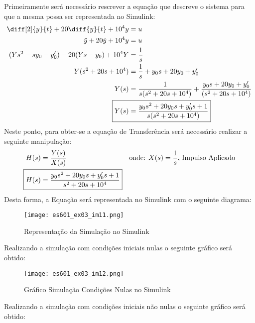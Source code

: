 \documentclass{article}
\begin{document}
            \begin{resolution}
                Primeiramente será necessário rescrever a equação que descreve o sistema para que a mesma possa ser representada no Simulink:
                    \begin{align}
                        \diff[2]{y}{t} + 20\diff{y}{t} +10^4y &= u\nonumber\\
                        \ddot{y} + 20\dot{y} + 10^4y          &= u\nonumber\\
                        (Ys^2 - sy_{0} - y'_{0}) + 20(Ys - y_{0}) + 10^4Y &= \frac{1}{s}\nonumber\\
                        Y(s^2 + 20s + 10^4) &= \frac{1}{s} + y_{0}s + 20y_{0} + y'_ {0}\nonumber\\
                        Y(s) &= \frac{1}{s(s^2 + 20s + 10^4)} + \frac{y_{0}s + 20y_{0} + y'_{0}}{(s^2 + 20s + 10^4)} \label{eq:simulinkYsB}\\
                        \Aboxed{Y(s) &= \frac{y_{0}s^2 + 20y_{0}s + y'_{0}s + 1}{s(s^2 + 20s + 10^4)}}
                    \end{align}
                Neste ponto, para obter-se a equação de Transferência será necessário realizar a seguinte manipulação:
                    \begin{align}
                        H(s) &= \frac{Y(s)}{X(s)} & \text{onde: $X(s) = \frac{1}{s}$, Impulso Aplicado}\nonumber\\
                        \Aboxed{H(s) &= \frac{y_{0}s^2 + 20y_{0}s + y'_{0}s + 1}{s^2 + 20s + 10^4}}
                    \end{align}
\newpage
                Desta forma, a Equação será representada no Simulink com o seguinte diagrama:
                    \begin{figure}[H]
                        \centering
                        \texttt{[image: es601\_ex03\_im11.png]}
                        \caption{Representação da Simulação no Simulink}
                    \end{figure}
                Realizando a simulação com condições iniciais nulas o seguinte gráfico será obtido:
                    \begin{figure}[H]
                        \centering
                        \texttt{[image: es601\_ex03\_im12.png]}
                        \caption{Gráfico Simulação Condições Nulas no Simulink}
                    \end{figure}
                Realizando a simulação com condições iniciais não nulas o seguinte gráfico será obtido:

\end{resolution}
\end{document}
